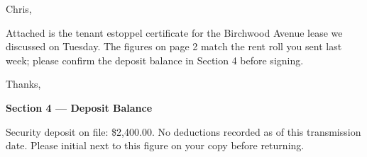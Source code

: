 \documentclass[english,12pt]{facsimile}
\author{Priya Nakamura} %
\begin{document}
\makefaxtitle

\opening{Chris,}

Attached is the tenant estoppel certificate for the Birchwood Avenue
lease we discussed on Tuesday. The figures on page 2 match the rent
roll you sent last week; please confirm the deposit balance in
Section 4 before signing.

\closing{Thanks,}

\newpage
\thispagestyle{fancy}
\textbf{Section 4 --- Deposit Balance}

Security deposit on file: \$2{,}400.00. No deductions recorded as of
this transmission date. Please initial next to this figure on your
copy before returning.
\end{document}
